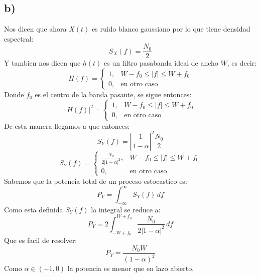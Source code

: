 \documentclass{article}
\begin{document}
\subsection*{\small b)}
Nos dicen que ahora \(X(t)\) es ruido blanco gaussiano por lo que tiene densidad espectral:
\[
S_X(f)=\frac{N_0}{2}
\]
Y tambien nos dicen que \(h(t)\) es un filtro pasabanda ideal de ancho \(W\), es decir:
\[
H(f)=
\begin{cases}
1, & W-f_0 \le |f| \le W+f_0 \\
0, & \text{en otro caso}
\end{cases}
\]
Donde \(f_0\) es el centro de la banda pasante, se sigue entonces:
\[
|H(f)|^{2}=
\begin{cases}
1, & W-f_0 \le |f| \le W+f_0  \\
0, & \text{en otro caso}
\end{cases}
\]
De esta manera llegamos a que entonces:
\[
S_Y(f) = \left|\frac{1}{1-\alpha}\right|^{2}\frac{N_0}{2}
\]
\[
S_Y(f) = 
\begin{cases}
\frac{N_0}{2\left|1-\alpha\right|^{2}}, & W-f_0 \le |f| \le W+f_0 \\
0, & \text{en otro caso}
\end{cases}
\]
Sabemos que la potencia total de un proceso estocastico es:
\[
P_Y = \int_{-\infty}^{\infty}S_Y(f)\,df
\]
Como esta definida \(S_Y(f)\) la integral se reduce a:
\[
P_Y = 2\int_{-W+f_0 }^{W+f_0}\frac{N_0}{2\left|1-\alpha\right|^{2}}\,df
\]
Que es facil de resolver:
\[
P_Y = \frac{N_0 W}{(1-\alpha)^{2}}
\]
Como \(\alpha\in \left(-1,0\right)\) la potencia es menor que en lazo abierto.
\end{document}
